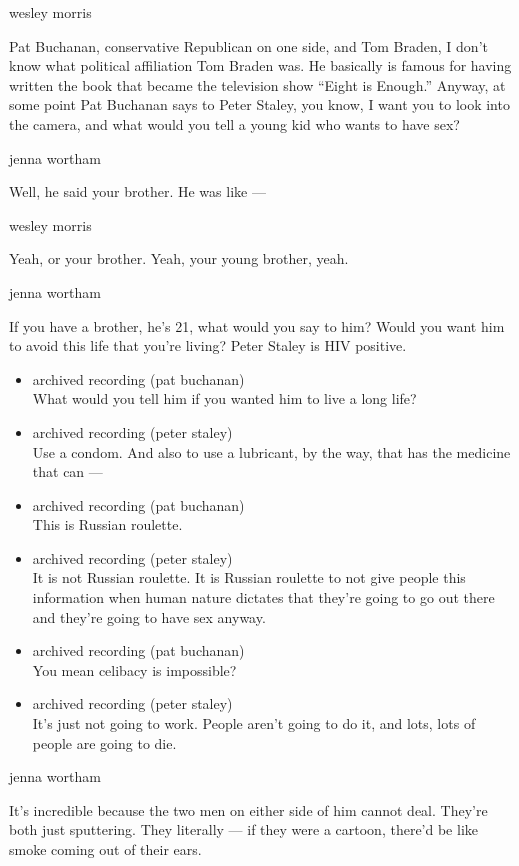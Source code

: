 wesley morris

Pat Buchanan, conservative Republican on one side, and Tom Braden, I
don't know what political affiliation Tom Braden was. He basically is
famous for having written the book that became the television show
``Eight is Enough.'' Anyway, at some point Pat Buchanan says to Peter
Staley, you know, I want you to look into the camera, and what would you
tell a young kid who wants to have sex?

jenna wortham

Well, he said your brother. He was like ---

wesley morris

Yeah, or your brother. Yeah, your young brother, yeah.

jenna wortham

If you have a brother, he's 21, what would you say to him? Would you
want him to avoid this life that you're living? Peter Staley is HIV
positive.

\begin{itemize}
\item
  archived recording (pat buchanan)\\
  What would you tell him if you wanted him to live a long life?
\item
  archived recording (peter staley)\\
  Use a condom. And also to use a lubricant, by the way, that has the
  medicine that can ---
\item
  archived recording (pat buchanan)\\
  This is Russian roulette.
\item
  archived recording (peter staley)\\
  It is not Russian roulette. It is Russian roulette to not give people
  this information when human nature dictates that they're going to go
  out there and they're going to have sex anyway.
\item
  archived recording (pat buchanan)\\
  You mean celibacy is impossible?
\item
  archived recording (peter staley)\\
  It's just not going to work. People aren't going to do it, and lots,
  lots of people are going to die.
\end{itemize}

jenna wortham

It's incredible because the two men on either side of him cannot deal.
They're both just sputtering. They literally --- if they were a cartoon,
there'd be like smoke coming out of their ears.

